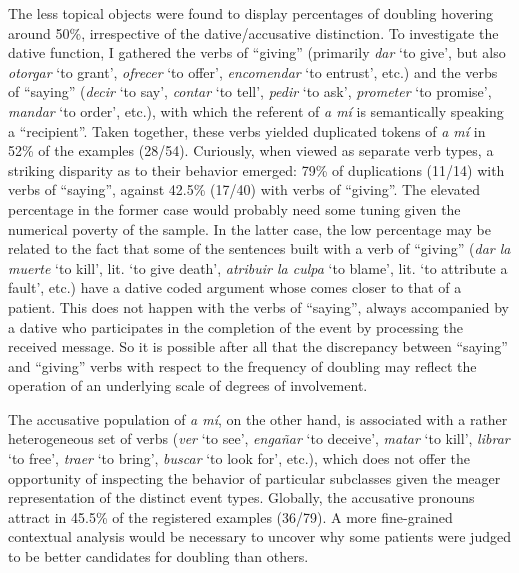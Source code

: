 \documentclass[output=paper]{LSP/langsci}
\begin{document}
 The less topical objects were found to display percentages of doubling hovering around 50\%, irrespective of the dative/accusative distinction. To investigate the dative function, I gathered the verbs of “giving” (primarily \textit{dar} ‘to give’, but also \textit{otorgar} ‘to grant’, \textit{ofrecer} ‘to offer’, \textit{encomendar} ‘to entrust’, etc.) and the verbs of “saying” (\textit{decir} ‘to say’, \textit{contar} ‘to tell’, \textit{pedir} ‘to ask’, \textit{prometer} ‘to promise’, \textit{mandar} ‘to order’, etc.), with which the referent of \textit{a mí} is semantically speaking a “recipient”. Taken together, these verbs yielded duplicated tokens of \textit{a mí} in 52\% of the examples (28/54). Curiously, when viewed as separate verb types, a striking disparity as to their behavior emerged: 79\% of duplications (11/14) with verbs of “saying”, against 42.5\% (17/40) with verbs of “giving”. The elevated percentage in the former case would probably need some tuning given the numerical poverty of the sample. In the latter case, the low percentage may be related to the fact that some of the sentences built with a verb of “giving” (\textit{dar la muerte} ‘to kill’, lit. ‘to give death’, \textit{atribuir la culpa} ‘to blame’, lit. ‘to attribute a fault’, etc.) have a dative coded argument whose  comes closer to that of a patient. This does not happen with the verbs of “saying”, always accompanied by a dative who participates in the completion of the event by processing the received message. So it is possible after all that the discrepancy between “saying” and “giving” verbs with respect to the frequency of doubling may reflect the operation of an underlying scale of degrees of involvement.

 The accusative population of \textit{a mí}, on the other hand, is associated with a rather heterogeneous set of verbs (\textit{ver} ‘to see’, \textit{engañar} ‘to deceive’, \textit{matar} ‘to kill’, \textit{librar} ‘to free’, \textit{traer} ‘to bring’, \textit{buscar} ‘to look for’, etc.), which does not offer the opportunity of inspecting the behavior of particular subclasses given the meager representation of the distinct event types. Globally, the accusative pronouns attract  in 45.5\% of the registered examples (36/79). A more fine-grained contextual analysis would be necessary to uncover why some patients were judged to be better candidates for doubling than others. 
\end{document}
